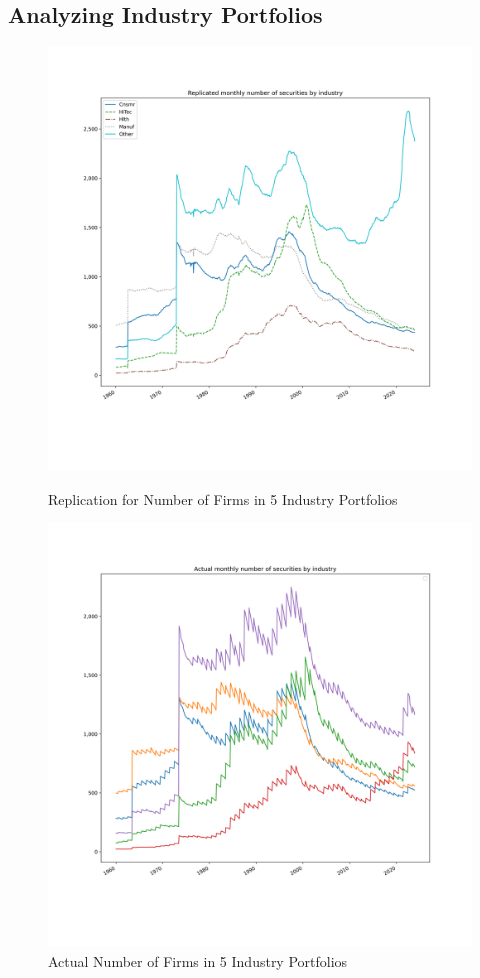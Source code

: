 \documentclass{article}
\begin{document}
\subsection*{Analyzing Industry Portfolios}
\begin{figure}[]
  \centering
  \includegraphics[width=.8\textwidth]{output/sec_per_ind_5.png}
  \caption{Replication for Number of Firms in 5 Industry Portfolios}
  \includegraphics[width=.8\textwidth]{output/actual_sec_per_ind_5.png}
  \caption{Actual Number of Firms in 5 Industry Portfolios}
\end{figure}
\end{document}
